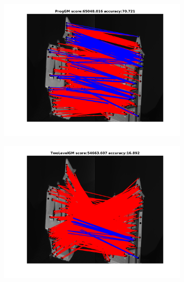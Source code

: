 \documentclass[
	fontsize=12pt,
	paper=a4,
	twoside=false,
	numbers=noenddot,
	plainheadsepline,
	toc=listof,
	toc=bibliography
]{scrartcl}
\begin{document}
\begin{figure}[h]	
	\begin{subfigure}[b]{0.3\textwidth}
		\centering
		\includegraphics[scale=0.25]{"fig_ver2608/RealImages/House_seq/no_descr/using_cdf_afftrafo/ext_solution/fi_11_ProgGM"}  
	\end{subfigure}%
	\begin{subfigure}[b]{0.3\textwidth}
		\centering
		\includegraphics[scale=0.25]{"fig_ver2608/RealImages/House_seq/no_descr/using_cdf_afftrafo/ext_solution/fi_11_TwoLevelGM"}  
	\end{subfigure} 
	\begin{subfigure}[b]{0.3\textwidth}
		\centering

\end{subfigure}
\end{figure}
\end{document}
